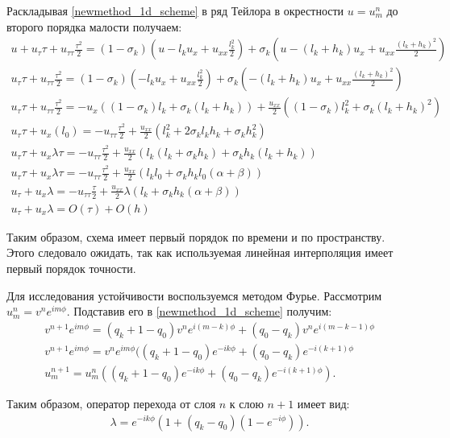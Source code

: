 Раскладывая \ref{newmethod_1d_scheme} в ряд Тейлора в окрестности $u = u_m^n$ до второго порядка малости получаем:
\begin{eqnarray}
u + u_\tau \tau + u_{\tau\tau} \frac{\tau^2}{2} = (1 - \sigma_k) (u - l_k u_x + u_{xx} \frac{l_k^2}{2}) + \sigma_k (u - (l_k+h_k) u_x + u_{xx} \frac{(l_k+h_k)^2}{2}) \nonumber\\
u_\tau \tau + u_{\tau\tau} \frac{\tau^2}{2} = (1 - \sigma_k) (- l_k u_x + u_{xx} \frac{l_k^2}{2}) + \sigma_k (- (l_k+h_k) u_x + u_{xx} \frac{(l_k+h_k)^2}{2}) \nonumber\\
u_\tau \tau + u_{\tau\tau} \frac{\tau^2}{2} = - u_x ( (1 - \sigma_k) l_k + \sigma_k (l_k+h_k) ) + \frac{u_{xx}}{2} ( (1 - \sigma_k) l_k^2 + \sigma_k (l_k+h_k)^2 ) \nonumber\\
u_\tau \tau + u_x  ( l_0 ) = - u_{\tau\tau} \frac{\tau^2}{2} + \frac{u_{xx}}{2} ( l_k^2 + 2 \sigma_k l_k h_k + \sigma_k h_k^2 ) \nonumber\\
u_\tau \tau + u_x  \lambda \tau = - u_{\tau\tau} \frac{\tau^2}{2} + \frac{u_{xx}}{2} ( l_k (l_k + \sigma_k h_k) + \sigma_k h_k (l_k + h_k) ) \nonumber\\
u_\tau \tau + u_x  \lambda \tau = - u_{\tau\tau} \frac{\tau^2}{2} + \frac{u_{xx}}{2} ( l_k l_0  + \sigma_k h_k l_0 (\alpha + \beta) ) \nonumber\\
u_\tau + u_x  \lambda = - u_{\tau\tau} \frac{\tau}{2} + \frac{u_{xx}}{2} \lambda ( l_k  + \sigma_k h_k (\alpha + \beta) ) \nonumber\\
u_\tau + u_x  \lambda = O(\tau) + O (h)
\end{eqnarray}

Таким образом, схема имеет первый порядок по времени и по пространству. Этого следовало ожидать, так как используемая линейная интерполяция имеет первый порядок точности.

Для исследования устойчивости воспользуемся методом Фурье. Рассмотрим $u_m^n = v^n e^{im\phi}$. Подставив его в \ref{newmethod_1d_scheme} получим:
\begin{eqnarray}
v^{n+1} e^{im\phi} = (q_k + 1 - q_0) v^{n} e^{i(m-k)\phi} + (q_0 - q_k) v^{n} e^{i(m-k-1)\phi} \nonumber\\
v^{n+1} e^{im\phi} = v^{n} e^{im\phi} ((q_k + 1 - q_0) e^{-ik\phi} + (q_0 - q_k) e^{-i(k+1)\phi} \nonumber\\
u_m^{n+1} = u_m^n ((q_k + 1 - q_0) e^{-ik\phi} + (q_0 - q_k) e^{-i(k+1)\phi}).
\end{eqnarray}

Таким образом, оператор перехода от слоя $n$ к слою $n+1$ имеет вид:
\begin{eqnarray}
\lambda = e^{-ik\phi} ( 1 + (q_k - q_0) (1 - e^{-i\phi}) ).
\end{eqnarray}

